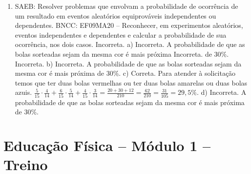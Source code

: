 \begin{enumerate}
\item
SAEB: Resolver problemas que envolvam a probabilidade de
ocorrência de um resultado em eventos aleatórios equiprováveis
independentes ou dependentes. 
BNCC: EF09MA20 -- Reconhecer, em experimentos aleatórios, eventos independentes
e dependentes e calcular a probabilidade de sua ocorrência, nos dois casos.
 Incorreta. a) Incorreta. A probabilidade de que as bolas sorteadas sejam da mesma cor é mais próxima Incorreta.  de 30\%.
 Incorreta. b) Incorreta. A probabilidade de que as bolas sorteadas sejam da mesma cor é mais próxima de 30\%.
c) Correta. Para atender à solicitação temos que ter duas bolas vermelhas ou ter
duas bolas amarelas ou duas bolas azuis. $\frac{5}{15} \cdot \frac{4}{14} + \frac{6}{15} \cdot \frac{5}{14} + \frac{4}{15} \cdot \frac{3}{14} = \frac{20 + 30 + 12}{210} = \frac{62}{210} = \frac{31}{105} = 29,5\%$.
d) Incorreta. A probabilidade de que as bolas sorteadas sejam da mesma cor é mais próxima de 30\%.
\end{enumerate}

\section*{Educação Física – Módulo 1 –  Treino}

